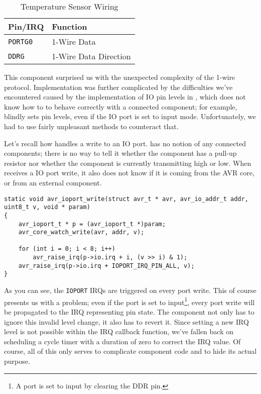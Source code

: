\begin{table}[ht]
\centering
\begin{tabular}{ll}
\toprule

Pin/\ac{IRQ}        & Function \\

\midrule

\lstinline|PORTG0|  & 1-Wire Data\\
\lstinline|DDRG|    & 1-Wire Data Direction\\

\bottomrule
\end{tabular}
\caption{Temperature Sensor Wiring}
\label{tab:wiring_temperature}
\end{table}

This component surprised us with the unexpected complexity of the 1-wire protocol.
Implementation was further complicated by the difficulties we've encountered
caused by the implementation of \ac{IO} pin levels
in \simavr, which does not know how to to behave correctly with a connected
component; for example, \simavr blindly sets pin levels, even if the \ac{IO} port
is set to input mode. Unfortunately, we had to use fairly unpleasant methods to
counteract that.

Let's recall how \simavr handles a write to an \ac{IO} port. \simavr has no
notion of any connected components; there is no way to tell it whether the component
has a pull-up resistor nor whether the component is currently transmitting high
or low. When \simavr receives a \ac{IO} port write, it also does not know
if it is coming from the \ac{AVR} core, or from an external component.

\begin{lstlisting}
static void avr_ioport_write(struct avr_t * avr, avr_io_addr_t addr, uint8_t v, void * param)
{
    avr_ioport_t * p = (avr_ioport_t *)param;
    avr_core_watch_write(avr, addr, v);

    for (int i = 0; i < 8; i++)
        avr_raise_irq(p->io.irq + i, (v >> i) & 1);
    avr_raise_irq(p->io.irq + IOPORT_IRQ_PIN_ALL, v);
}
\end{lstlisting}

As you can see, the \lstinline|IOPORT| \acp{IRQ} are triggered on every port write.
This of course presents us with a problem; even if the port is set to input\footnote{
%
A port is set to input by clearing the \ac{DDR} pin.
%
}, every port write will be propagated to the \ac{IRQ} representing pin state. The component
not only has to ignore this invalid level change, it also has to revert it.
Since setting a new \ac{IRQ} level is not possible within the \ac{IRQ} callback function,
we've fallen back on scheduling a cycle timer with a duration of zero to correct
the \ac{IRQ} value. Of course, all of this only serves to complicate component
code and to hide its actual purpose.


